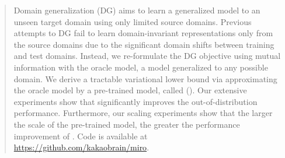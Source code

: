 \begin{abstract}
Domain generalization (DG) aims to learn a generalized model to an unseen target domain using only limited source domains. Previous attempts to DG fail to learn domain-invariant representations only from the source domains due to the significant domain shifts between training and test domains. Instead, we re-formulate the DG objective using mutual information with the oracle model, a model generalized to any possible domain. We derive a tractable variational lower bound via approximating the oracle model by a pre-trained model, called \fullname{} (\method{}). Our extensive experiments show that \method{} significantly improves the out-of-distribution performance. Furthermore, our scaling experiments show that the larger the scale of the pre-trained model, the greater the performance improvement of \method{}. 
Code is available at \url{https://github.com/kakaobrain/miro}.


\end{abstract}